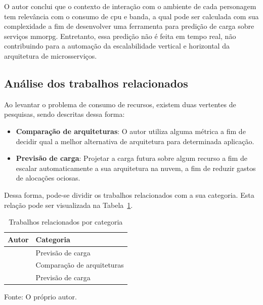 O autor conclui que o contexto de interação com o ambiente de cada personagem tem relevância com o consumo de \ac{cpu} e banda, a qual pode ser calculada com sua complexidade a fim de desenvolver uma ferramenta para predição de carga sobre serviços \ac{mmorpg}.
%
Entretanto, essa predição não é feita em tempo real, não contribuindo para a automação da escalabilidade vertical e horizontal da arquitetura de microsserviços.



\subsection{Análise dos trabalhos relacionados}
\label{sec:similares_analise}



%
Ao levantar o problema de consumo de recursos, existem duas vertentes de pesquisas, sendo descritas dessa forma: %

\begin{itemize}
  \item \textbf{Comparação de arquiteturas}: O autor utiliza alguma métrica a fim de decidir qual a melhor alternativa de arquitetura para determinada aplicação.
  \item \textbf{Previsão de carga}: Projetar a carga futura sobre algum recurso a fim de escalar automaticamente a sua arquitetura na nuvem, a fim de reduzir gastos de alocações ociosas.
\end{itemize}

Dessa forma, pode-se dividir os trabalhos relacionados com a sua categoria.
%
Esta relação pode ser visualizada na Tabela~\ref{tab:categoria_trabalhos}.

\begin{table}[htb!]
\centering
\caption{Trabalhos relacionados por categoria}
\label{tab:categoria_trabalhos}
\begin{tabular}{|l|l|}
\hline
Autor & Categoria                            \\ \hline
\cite{6374456}  & Previsão de carga          \\ \hline
\cite{7515686}  & Comparação de arquiteturas \\ \hline
\cite{1417630}  & Previsão de carga          \\ \hline
\end{tabular}


Fonte: O próprio autor.
\end{table}

